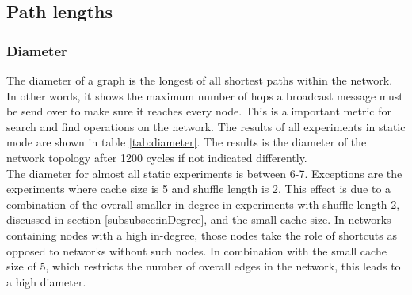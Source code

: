 \begin{figure}
\begin{subfigure}{.5\textwidth}

\end{subfigure}
\end{figure}
\FloatBarrier
\subsection{Path lengths}
\subsubsection{Diameter}
\label{subsubsec:diameter}
The diameter of a graph is the longest of all shortest paths within the network.
In other words, it shows the maximum number of hops a broadcast message must be
send over to make sure it reaches every node. This is a important metric for
search and find operations on the network. The results of all experiments in
static mode are shown in table \ref{tab:diameter}. The results is the
diameter of the network topology after 1200 cycles if not indicated
differently.\\
The diameter for almost all static experiments is between 6-7. Exceptions are
the experiments where cache size is 5 and shuffle length is 2. This effect
is due to a combination of the overall smaller in-degree in experiments with
shuffle length 2, discussed in section \ref{subsubsec:inDegree}, and the small
cache size. In networks containing nodes with a high in-degree, those nodes take
the role of shortcuts as opposed to networks without such nodes. In combination
with the small cache size of 5, which restricts the number of overall edges in
the network, this leads to a high diameter.  


